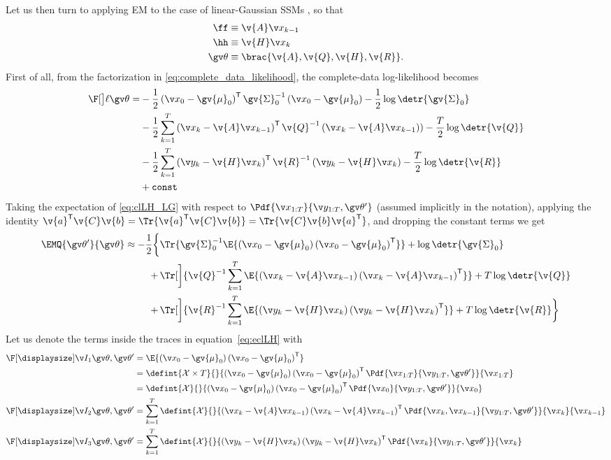 Let us then turn to applying EM to the case of linear-Gaussian SSMs
\parencite{shumway1982approach,Ghahramani1996}
, so that
\begin{align}
	\ff &\equiv \v{A}\xkk\\
	\hh &\equiv \v{H}\xk\\
	\Th &\equiv \brac{\v{A},\v{Q},\v{H},\v{R}}.
	\label{tablelabel}
\end{align}
First of all, from the factorization in \eqref{eq:complete_data_likelihood}, the complete-data log-likelihood becomes
\begin{align}
\label{eq:clLH_LG}
\begin{split}
	\lLH
	=&-\frac{1}{2}\left(\x_0-\gv{\mu}_0\right)^\tr\gv{\Sigma}_0^{-1}\left(\x_0-\gv{\mu}_0\right)-\frac{1}{2}\log\detr{\gv{\Sigma}_0}\\
	&-\frac{1}{2}\sum_{k=1}^T\left(\x_k-\v{A}\xkk\right)^\tr\v{Q}^{-1}\left(\x_k-\v{A}\xkk)\right)-\frac{T}{2}\log\detr{\v{Q}}\\
	&-\frac{1}{2}\sum_{k=1}^T\left(\y_k-\v{H}\xk\right)^\tr\v{R}^{-1}\left(\y_k-\v{H}\xk\right)-\frac{T}{2}\log\detr{\v{R}}\\
	&+\mathtt{const}
\end{split}
\end{align}
Taking the expectation of \eqref{eq:clLH_LG} with respect to $\Pdf{\X}{\Y,\Th'}$ (assumed implicitly in the notation),
applying the identity $\v{a}^\tr\v{C}\v{b}=\Tr{\v{a}^\tr\v{C}\v{b}}=\Tr{\v{C}\v{b}\v{a}^\tr}$, and dropping the constant terms we get
\begin{align}
\begin{split}
	\EMQ{\Th'}{\Th} \approx -\frac{1}{2}\bigg\{&\Tr{\gv{\Sigma}_0^{-1}\E{\left(\x_0-\gv{\mu}_0\right)\left(\x_0-\gv{\mu}_0\right)^\tr}}+\log\detr{\gv{\Sigma}_0}\\
	+\,&\Tr[\bigg]{\v{Q}^{-1}\sum_{k=1}^T\E{\left(\x_k-\v{A}\xkk\right)\left(\x_k-\v{A}\xkk\right)^\tr}}+T\log\detr{\v{Q}}\\
	+\,&\Tr[\bigg]{\v{R}^{-1}\sum_{k=1}^T\E{\left(\y_k-\v{H}\xk\right)\left(\y_k-\v{H}\xk\right)^\tr}}+T\log\detr{\v{R}}\bigg\}
\end{split}
\label{eq:eclLH}
\end{align} 
Let us denote the terms inside the traces in equation~\eqref{eq:eclLH} with
\begin{align}
	\II{1} &= \E{\left(\x_0-\gv{\mu}_0\right)\left(\x_0-\gv{\mu}_0\right)^\tr}\\ 
	&=\defint{\mathcal{X}\times T}{}{\left(\x_0-\gv{\mu}_0\right)\left(\x_0-\gv{\mu}_0\right)^\tr\Pdf{\X}{\Y,\Th'}}{\X}\nonumber\\
	&= 	\defint{\mathcal{X}}{}{\left(\x_0-\gv{\mu}_0\right)\left(\x_0-\gv{\mu}_0\right)^\tr\Pdf{\x_0}{\Y,\Th'}}{\x_0} \label{eq:I1_general}\\
	\II{2} &= \sum_{k=1}^T\defint{\mathcal{X}}{}{\left(\x_k-\v{A}\xkk\right)\left(\x_k-\v{A}\xkk\right)^\tr\Pdf{\xk,\xkk}{\Y,\Th'}}{\xk}{\xkk} \label{eq:I2_general}\\
	\II{3} &=
	\sum_{k=1}^T\defint{\mathcal{X}}{}{\left(\y_k-\v{H}\xk\right)\left(\y_k-\v{H}\xk\right)^\tr\Pdf{\xk}{\Y,\Th'}}{\xk}
	\label{eq:I3_general} \end{align}%
